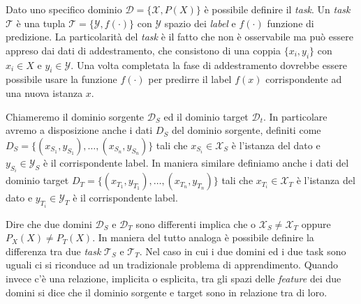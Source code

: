 Dato uno specifico dominio $\mathcal{D} = \{\mathcal{X}, P(X)\}$ è possibile definire il \textit{task}. Un \textit{task} $\mathcal{T}$ è una tupla $\mathcal{T} = \{\mathcal{Y},f(\cdot)\}$ con $\mathcal{Y}$ spazio dei \textit{label} e $f(\cdot)$ funzione di predizione. La particolarità del \textit{task} è il fatto che non è osservabile ma può essere appreso dai dati di addestramento, che consistono di una coppia $\{x_i, y_i\}$ con $x_i \in X$ e $y_i \in \mathcal{Y}$. Una volta completata la fase di addestramento dovrebbe essere possibile usare la funzione $f(\cdot)$ per predirre il label $f(x)$ corrispondente ad una nuova istanza $x$.

Chiameremo il dominio sorgente $\mathcal{D}_S$ ed il dominio target $\mathcal{D}_t$. In particolare avremo a disposizione anche i dati $D_S$ del dominio sorgente, definiti 
come $D_S = \{(x_{S_1}, y_{S_1}), \dots, (x_{S_n}, y_{S_n})\}$ tali che $x_{S_i} \in \mathcal{X}_S$ è l'istanza del dato e $y_{S_i} \in \mathcal{Y}_S$ è il corrispondente label. In maniera similare definiamo anche i dati del dominio target $D_T = \{(x_{T_1}, y_{T_1}), \dots, (x_{T_n}, y_{T_n})\} $ tali che $x_{T_i} \in \mathcal{X}_T$ è l'istanza del dato e $y_{T_i} \in \mathcal{Y}_T$ è il corrispondente label. 

Dire che due domini $\mathcal{D}_S$ e $\mathcal{D}_T$ sono differenti implica che  o $\mathcal{X}_S \neq \mathcal{X}_T$ oppure $P_X(X) \neq P_T(X)$. In maniera del tutto analoga è possibile definire la differenza tra due \textit{task} $\mathcal{T}_S \text{ e } \mathcal{T}_T$. Nel caso in cui i due domini ed i due task sono uguali ci si riconduce ad un tradizionale problema di apprendimento. Quando invece c'è una relazione, implicita o esplicita, tra gli spazi delle \textit{feature} dei due domini si dice che il dominio sorgente e target sono in relazione tra di loro.
